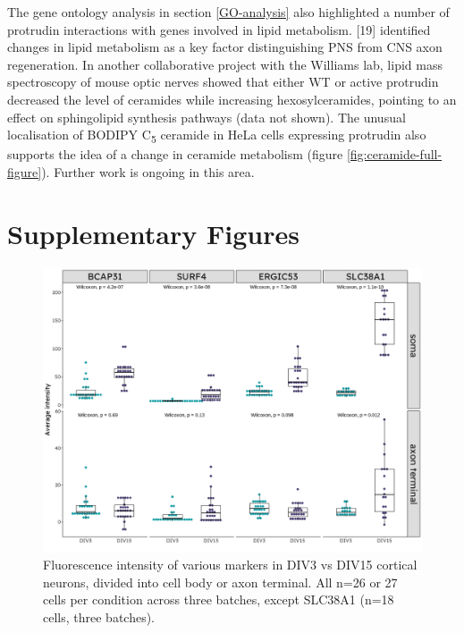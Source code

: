 \documentclass[
  12pt,
  a4paper,
]{book}
\begin{document}
The gene ontology analysis in section \ref{GO-analysis} also highlighted a number of protrudin interactions with genes involved in lipid metabolism. {[}19{]} identified changes in lipid metabolism as a key factor distinguishing PNS from CNS axon regeneration. In another collaborative project with the Williams lab, lipid mass spectroscopy of mouse optic nerves showed that either WT or active protrudin decreased the level of ceramides while increasing hexosylceramides, pointing to an effect on sphingolipid synthesis pathways (data not shown). The unusual localisation of BODIPY C\textsubscript{5} ceramide in HeLa cells expressing protrudin also supports the idea of a change in ceramide metabolism (figure \ref{fig:ceramide-full-figure}). Further work is ongoing in this area.

\hypertarget{APPENDIX}{%
\chapter*{Supplementary Figures}\label{APPENDIX}}


\begin{figure}
\centering
\includegraphics{../figures/full/suppl-dev-grid-1.png}
\caption{\label{fig:suppl-dev-grid}Fluorescence intensity of various markers in DIV3 vs DIV15 cortical neurons, divided into cell body or axon terminal. All n=26 or 27 cells per condition across three batches, except SLC38A1 (n=18 cells, three batches).}
\end{figure}
\end{document}
